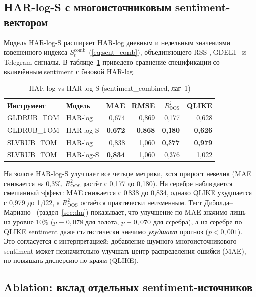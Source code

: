 \subsection{HAR-log-S с многоисточниковым sentiment-вектором}

Модель HAR-log-S расширяет HAR-log дневным и недельным значениями
взвешенного индекса $S_t^{\text{comb}}$~(\ref{eq:sent_comb}),
объединяющего RSS-, GDELT- и Telegram-сигналы.
В таблице~\ref{tab:har_s_results} приведено сравнение спецификации
со включённым sentiment с базовой HAR-log.

\begin{table}[h!]
\centering
\caption{HAR-log vs HAR-log-S (sentiment\_combined, лаг~1)}
\label{tab:har_s_results}
\begin{tabular}{llrrrr}
\hline
Инструмент & Модель & MAE & RMSE & $R^2_{\mathrm{OOS}}$ & QLIKE \\
\hline
GLDRUB\_TOM & HAR-log   & 0{,}674 & 0{,}869 & 0{,}177 & 0{,}628 \\
GLDRUB\_TOM & HAR-log-S & \textbf{0{,}672} & \textbf{0{,}868} & \textbf{0{,}180} & \textbf{0{,}626} \\
SLVRUB\_TOM & HAR-log   & 0{,}838 & 1{,}060 & \textbf{0{,}377} & \textbf{0{,}979} \\
SLVRUB\_TOM & HAR-log-S & \textbf{0{,}834} & 1{,}060 & 0{,}376 & 1{,}022 \\
\hline
\end{tabular}
\end{table}

На золоте HAR-log-S улучшает все четыре метрики, хотя прирост невелик
(MAE снижается на 0{,}3\%, $R^2_{\mathrm{OOS}}$ растёт с 0{,}177 до 0{,}180).
На серебре наблюдается смешанный эффект: MAE снижается с 0{,}838 до 0{,}834,
однако QLIKE ухудшается с 0{,}979 до 1{,}022, а $R^2_{\mathrm{OOS}}$
остаётся практически неизменным.
Тест Диболда--Мариано~\cite{Diebold1995} (раздел~\ref{sec:dm}) показывает,
что улучшение по MAE значимо лишь на уровне 10\%
($p=0{,}078$ для золота, $p=0{,}070$ для серебра),
а на серебре по QLIKE sentiment даже статистически значимо \textit{ухудшает}
прогноз ($p<0{,}001$).
Это согласуется с интерпретацией: добавление шумного многоисточникового
sentiment может незначительно улучшать центр распределения ошибки (MAE),
но повышать дисперсию по краям (QLIKE).

\subsection{Ablation: вклад отдельных sentiment-источников}
\label{sec:har_ablation}

